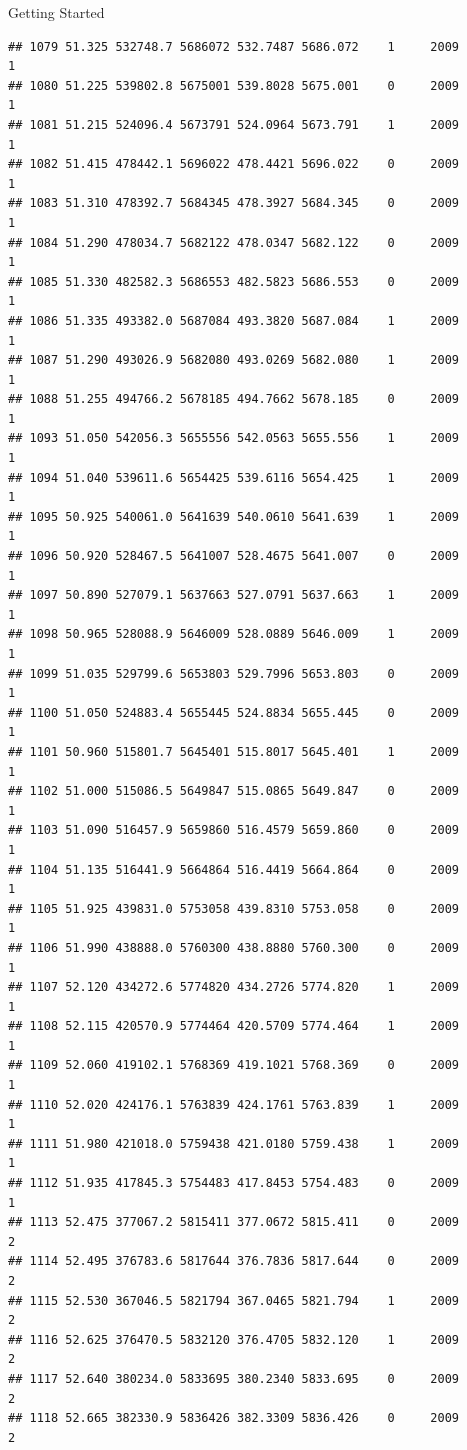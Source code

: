 \documentclass[
  ignorenonframetext,
]{beamer}
\begin{document}
\begin{frame}[fragile]{Getting Started}
\begin{verbatim}
## 1079 51.325 532748.7 5686072 532.7487 5686.072    1     2009        1
## 1080 51.225 539802.8 5675001 539.8028 5675.001    0     2009        1
## 1081 51.215 524096.4 5673791 524.0964 5673.791    1     2009        1
## 1082 51.415 478442.1 5696022 478.4421 5696.022    0     2009        1
## 1083 51.310 478392.7 5684345 478.3927 5684.345    0     2009        1
## 1084 51.290 478034.7 5682122 478.0347 5682.122    0     2009        1
## 1085 51.330 482582.3 5686553 482.5823 5686.553    0     2009        1
## 1086 51.335 493382.0 5687084 493.3820 5687.084    1     2009        1
## 1087 51.290 493026.9 5682080 493.0269 5682.080    1     2009        1
## 1088 51.255 494766.2 5678185 494.7662 5678.185    0     2009        1
## 1093 51.050 542056.3 5655556 542.0563 5655.556    1     2009        1
## 1094 51.040 539611.6 5654425 539.6116 5654.425    1     2009        1
## 1095 50.925 540061.0 5641639 540.0610 5641.639    1     2009        1
## 1096 50.920 528467.5 5641007 528.4675 5641.007    0     2009        1
## 1097 50.890 527079.1 5637663 527.0791 5637.663    1     2009        1
## 1098 50.965 528088.9 5646009 528.0889 5646.009    1     2009        1
## 1099 51.035 529799.6 5653803 529.7996 5653.803    0     2009        1
## 1100 51.050 524883.4 5655445 524.8834 5655.445    0     2009        1
## 1101 50.960 515801.7 5645401 515.8017 5645.401    1     2009        1
## 1102 51.000 515086.5 5649847 515.0865 5649.847    0     2009        1
## 1103 51.090 516457.9 5659860 516.4579 5659.860    0     2009        1
## 1104 51.135 516441.9 5664864 516.4419 5664.864    0     2009        1
## 1105 51.925 439831.0 5753058 439.8310 5753.058    0     2009        1
## 1106 51.990 438888.0 5760300 438.8880 5760.300    0     2009        1
## 1107 52.120 434272.6 5774820 434.2726 5774.820    1     2009        1
## 1108 52.115 420570.9 5774464 420.5709 5774.464    1     2009        1
## 1109 52.060 419102.1 5768369 419.1021 5768.369    0     2009        1
## 1110 52.020 424176.1 5763839 424.1761 5763.839    1     2009        1
## 1111 51.980 421018.0 5759438 421.0180 5759.438    1     2009        1
## 1112 51.935 417845.3 5754483 417.8453 5754.483    0     2009        1
## 1113 52.475 377067.2 5815411 377.0672 5815.411    0     2009        2
## 1114 52.495 376783.6 5817644 376.7836 5817.644    0     2009        2
## 1115 52.530 367046.5 5821794 367.0465 5821.794    1     2009        2
## 1116 52.625 376470.5 5832120 376.4705 5832.120    1     2009        2
## 1117 52.640 380234.0 5833695 380.2340 5833.695    0     2009        2
## 1118 52.665 382330.9 5836426 382.3309 5836.426    0     2009        2

\end{verbatim}
\end{frame}
\end{document}
